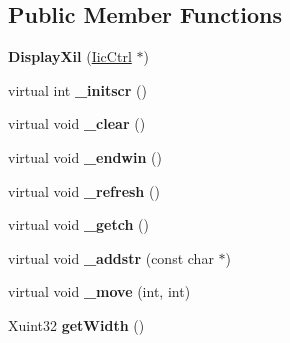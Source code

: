 \subsection*{Public Member Functions}
\begin{DoxyCompactItemize}
\item 
\hypertarget{class_display_xil_acd2a25de77eefd27b250ff4503957064}{{\bfseries Display\+Xil} (\hyperlink{class_iic_ctrl}{Iic\+Ctrl} $\ast$)}\label{class_display_xil_acd2a25de77eefd27b250ff4503957064}

\item 
\hypertarget{class_display_xil_a6767d57ca04825ba2e4479912a068b2e}{virtual int {\bfseries \+\_\+initscr} ()}\label{class_display_xil_a6767d57ca04825ba2e4479912a068b2e}

\item 
\hypertarget{class_display_xil_adea353eaa49aa54254edb62bafcd6157}{virtual void {\bfseries \+\_\+clear} ()}\label{class_display_xil_adea353eaa49aa54254edb62bafcd6157}

\item 
\hypertarget{class_display_xil_ae6cb9b43498f469a41da87f36ee1690f}{virtual void {\bfseries \+\_\+endwin} ()}\label{class_display_xil_ae6cb9b43498f469a41da87f36ee1690f}

\item 
\hypertarget{class_display_xil_a9c62240b8933713ed3eb9dd877c609f8}{virtual void {\bfseries \+\_\+refresh} ()}\label{class_display_xil_a9c62240b8933713ed3eb9dd877c609f8}

\item 
\hypertarget{class_display_xil_a7f2623c14f9777af5d58805557acd48b}{virtual void {\bfseries \+\_\+getch} ()}\label{class_display_xil_a7f2623c14f9777af5d58805557acd48b}

\item 
\hypertarget{class_display_xil_ac110fd5b80fa314ec631cebe53322cdb}{virtual void {\bfseries \+\_\+addstr} (const char $\ast$)}\label{class_display_xil_ac110fd5b80fa314ec631cebe53322cdb}

\item 
\hypertarget{class_display_xil_ac14d60ce17eb29dd2b8f95c795f0ed1a}{virtual void {\bfseries \+\_\+move} (int, int)}\label{class_display_xil_ac14d60ce17eb29dd2b8f95c795f0ed1a}

\item 
\hypertarget{class_display_xil_aa49760c3485ac443c17e5aa22e5bdf58}{Xuint32 {\bfseries get\+Width} ()}\label{class_display_xil_aa49760c3485ac443c17e5aa22e5bdf58}


\end{DoxyCompactItemize}
